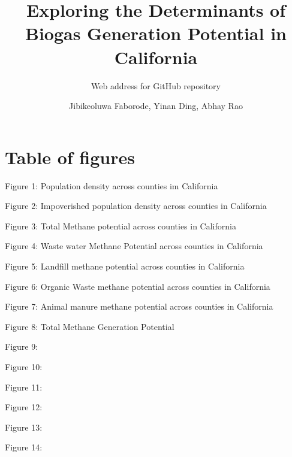 \documentclass[
  12pt,
]{article}
\title{Exploring the Determinants of Biogas Generation Potential in
California}
\subtitle{Web address for GitHub repository}
\author{Jibikeoluwa Faborode, Yinan Ding, Abhay Rao}
\date{}
\begin{document}
\maketitle

\newpage
\tableofcontents 
\newpage
\listoftables 
\newpage

\hypertarget{table-of-figures}{%
\section{Table of figures}\label{table-of-figures}}

Figure 1: Population density across counties im California

Figure 2: Impoverished population density across counties in California

Figure 3: Total Methane potential across counties in California

Figure 4: Waste water Methane Potential across counties in California

Figure 5: Landfill methane potential across counties in California

Figure 6: Organic Waste methane potential across counties in California

Figure 7: Animal manure methane potential across counties in California

Figure 8: Total Methane Generation Potential

Figure 9:

Figure 10:

Figure 11:

Figure 12:

Figure 13:

Figure 14:

\newpage
\end{document}
